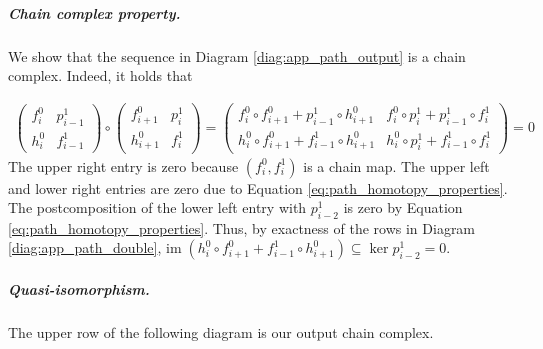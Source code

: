\documentclass[a4paper,UKenglish,cleveref,nolineno,autoref]{socg-lipics-v2021}
\newcommand{\ignore}[1]{}
\newcommand{\im}{\mathrm{im}\;}
\begin{document}
\subparagraph{Chain complex property.} We show that the sequence in Diagram \eqref{diag:app_path_output} is a chain complex. Indeed, it holds that 
\ignore{
\begin{align*}
\begin{pmatrix}f^0_i & p^1_{i-1} \\ h^0_i & f^1_{i-1} \end{pmatrix}\circ \begin{pmatrix}f^0_{i+1} & p^1_{i} \\ h^0_{i+1} & f^1_{i} \end{pmatrix}=\begin{pmatrix}f^0_{i}\circ f^0_{i+1}+p^1_{i-1}\circ h^0_{i+1} & h^0_i\circ f^0_{i+1}+f^1_{i-1}\circ h^0_{i+1} \\ f^0_i\circ p^1_i+p^1_{i-1}\circ f^1_i & h^0_i\circ p^1_i+f^1_{i-1}\circ f^1_i \end{pmatrix} = 0
\end{align*}
}
\begin{align*}
\begin{pmatrix}f^0_i & p^1_{i-1} \\ h^0_i & f^1_{i-1} \end{pmatrix}\circ \begin{pmatrix}f^0_{i+1} & p^1_{i} \\ h^0_{i+1} & f^1_{i} \end{pmatrix}=\begin{pmatrix}f^0_{i}\circ f^0_{i+1}+p^1_{i-1}\circ h^0_{i+1} & f^0_i\circ p^1_i+p^1_{i-1}\circ f^1_i \\ h^0_i\circ f^0_{i+1}+f^1_{i-1}\circ h^0_{i+1} & h^0_i\circ p^1_i+f^1_{i-1}\circ f^1_i \end{pmatrix} = 0
\end{align*}
The upper right entry is zero because $(f^0_i,f^1_i)$ is a chain map. The upper left and lower right entries are zero due to Equation \eqref{eq:path_homotopy_properties}. The postcomposition of the lower left entry with $p^1_{i-2}$ is zero by Equation \eqref{eq:path_homotopy_properties}. Thus, by exactness of the rows in Diagram \eqref{diag:app_path_double}, $ \im (h^0_i \circ f^0_{i+1}+f^1_{i-1}\circ h^0_{i+1})\subseteq \ker p^1_{i-2} = 0 $.

\subparagraph{Quasi-isomorphism.}  The upper row of the following diagram is our output chain complex. 
\end{document}
